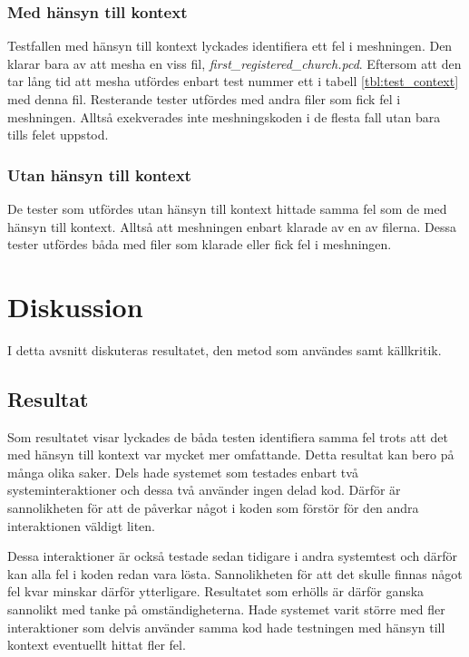 \subsubsection{Med hänsyn till kontext}

Testfallen med hänsyn till kontext lyckades identifiera ett fel i meshningen. Den klarar bara av att mesha en viss fil, \textit{first\_registered\_church.pcd}. Eftersom att den tar lång tid att mesha utfördes enbart test nummer ett i tabell \ref{tbl:test_context} med denna fil. Resterande tester utfördes med andra filer som fick fel i meshningen. Alltså exekverades inte meshningskoden i de flesta fall utan bara tills felet uppstod.

\subsubsection{Utan hänsyn till kontext}

De tester som utfördes utan hänsyn till kontext hittade samma fel som de med hänsyn till kontext. Alltså att meshningen enbart klarade av en av filerna. Dessa tester utfördes båda med filer som klarade eller fick fel i meshningen.

\section{Diskussion}
\label{sec:discussion-holmberg}

I detta avsnitt diskuteras resultatet, den metod som användes samt källkritik.

\subsection{Resultat}

Som resultatet visar lyckades de båda testen identifiera samma fel trots att det med hänsyn till kontext var mycket mer omfattande. Detta resultat kan bero på många olika saker. Dels hade systemet som testades enbart två systeminteraktioner och dessa två använder ingen delad kod. Därför är sannolikheten för att de påverkar något i koden som förstör för den andra interaktionen väldigt liten.

Dessa interaktioner är också testade sedan tidigare i andra systemtest och därför kan alla fel i koden redan vara lösta. Sannolikheten för att det skulle finnas något fel kvar minskar därför ytterligare. Resultatet som erhölls är därför ganska sannolikt med tanke på omständigheterna. Hade systemet varit större med fler interaktioner som delvis använder samma kod hade testningen med hänsyn till kontext eventuellt hittat fler fel.

